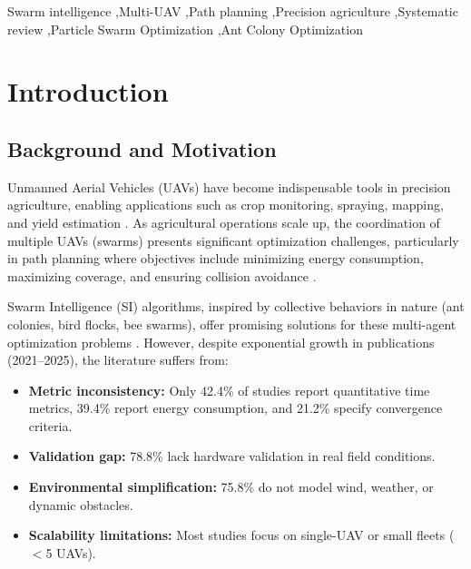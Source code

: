 \documentclass[review,3p,times]{elsarticle}
\begin{document}
\begin{frontmatter}
\begin{abstract}
\textbf{Conclusions:} Current research on SI-based multi-UAV path planning in agriculture remains heavily simulation-oriented and lacks standardized benchmarking frameworks. This study provides the first structured gap analysis for this domain and proposes a research agenda emphasizing experimental validation, dynamic environment modeling, and standardized evaluation metrics to accelerate practical deployment of swarm-based agricultural UAV systems.
\end{abstract}

\begin{keyword}
Swarm intelligence \sep Multi-UAV \sep Path planning \sep Precision agriculture \sep Systematic review \sep Particle Swarm Optimization \sep Ant Colony Optimization
\end{keyword}

\end{frontmatter}

\section{Introduction}

\subsection{Background and Motivation}
Unmanned Aerial Vehicles (UAVs) have become indispensable tools in precision agriculture, enabling applications such as crop monitoring, spraying, mapping, and yield estimation \cite{zhang2012,tsouros2019,puri2017,mogili2018,hunt2018}. As agricultural operations scale up, the coordination of multiple UAVs (swarms) presents significant optimization challenges, particularly in path planning where objectives include minimizing energy consumption, maximizing coverage, and ensuring collision avoidance \cite{chung2018,gupta2016,bekmezci2013,hayat2016}.

Swarm Intelligence (SI) algorithms, inspired by collective behaviors in nature (ant colonies, bird flocks, bee swarms), offer promising solutions for these multi-agent optimization problems \cite{dorigo2006,kennedy1995,blum2008,yang2010,beni2005,bonabeau1999,yang2013}. However, despite exponential growth in publications (2021--2025), the literature suffers from:
\begin{itemize}
  \item \textbf{Metric inconsistency:} Only 42.4\% of studies report quantitative time metrics, 39.4\% report energy consumption, and 21.2\% specify convergence criteria.
  \item \textbf{Validation gap:} 78.8\% lack hardware validation in real field conditions.
  \item \textbf{Environmental simplification:} 75.8\% do not model wind, weather, or dynamic obstacles.
  \item \textbf{Scalability limitations:} Most studies focus on single-UAV or small fleets ($<$5 UAVs).
\end{itemize}
\end{document}
